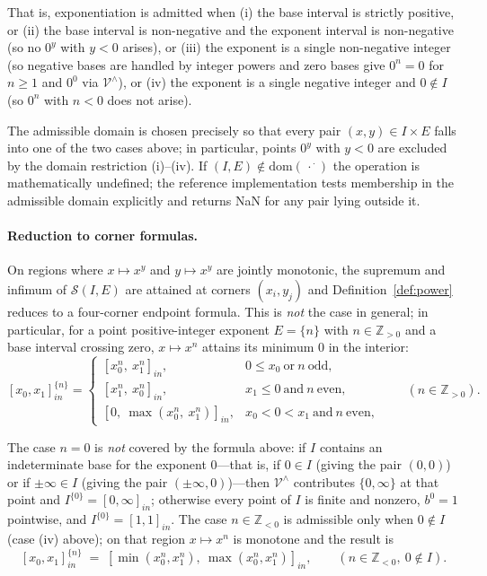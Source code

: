\documentclass[11pt,a4paper]{article}
\theoremstyle{paperdef}
\newcommand{\inI}[1]{[#1]_{in}}
\newcommand{\Vhat}{\mathcal{V}^{\wedge}}
\begin{document}
That is, exponentiation is admitted when (i) the base interval is
strictly positive, or (ii) the base interval is non-negative and the
exponent interval is non-negative (so no $0^{y}$ with $y < 0$
arises), or (iii) the exponent is a single non-negative integer (so
negative bases are handled by integer powers and zero bases give
$0^{n} = 0$ for $n \ge 1$ and $0^{0}$ via $\Vhat$), or (iv) the
exponent is a single negative integer and $0 \notin I$ (so $0^{n}$
with $n < 0$ does not arise).

The admissible domain is chosen precisely so that every pair
$(x, y) \in I \times E$ falls into one of the two cases above; in
particular, points $0^{y}$ with $y < 0$ are excluded by the domain
restriction (i)--(iv). If $(I, E) \notin \mathrm{dom}(\,\cdot^{\,\cdot})$
the operation is mathematically undefined; the reference
implementation tests membership in the admissible domain explicitly
and returns NaN for any pair lying outside it.

\paragraph{Reduction to corner formulas.} On regions where
$x \mapsto x^y$ and $y \mapsto x^y$ are jointly monotonic, the
supremum and infimum of $\mathcal{S}(I, E)$ are attained at corners
$(x_i, y_j)$ and Definition~\ref{def:power} reduces to a four-corner
endpoint formula. This is \emph{not} the case in general; in
particular, for a point positive-integer exponent $E = \{n\}$ with
$n \in \mathbb{Z}_{>0}$ and a base interval crossing zero,
$x \mapsto x^n$ attains its minimum $0$ in the interior:
\[
\inI{x_0, x_1}^{\{n\}} =
\begin{cases}
\inI{x_0^{n},\ x_1^{n}}, & 0 \le x_0\ \text{or}\ n\ \text{odd}, \\
\inI{x_1^{n},\ x_0^{n}}, & x_1 \le 0\ \text{and}\ n\ \text{even}, \\
\inI{0,\ \max(x_0^{n},\ x_1^{n})}, & x_0 < 0 < x_1\ \text{and}\ n\ \text{even},
\end{cases}
\qquad (n \in \mathbb{Z}_{>0}).
\]

The case $n = 0$ is \emph{not} covered by the formula above: if $I$
contains an indeterminate base for the exponent $0$---that is, if
$0 \in I$ (giving the pair $(0, 0)$) or if $\pm\infty \in I$ (giving
the pair $(\pm\infty, 0)$)---then $\Vhat$ contributes
$\{0, \infty\}$ at that point and $I^{\{0\}} = \inI{0, \infty}$;
otherwise every point of $I$ is finite and nonzero, $b^{0} = 1$
pointwise, and $I^{\{0\}} = \inI{1, 1}$. The case
$n \in \mathbb{Z}_{<0}$ is admissible only when $0 \notin I$ (case
(iv) above); on that region $x \mapsto x^n$ is monotone and the
result is
\[
\inI{x_0, x_1}^{\{n\}}
\;=\; \inI{\min(x_0^n, x_1^n),\ \max(x_0^n, x_1^n)},
\qquad (n \in \mathbb{Z}_{<0},\ 0 \notin I).
\]
\end{document}
